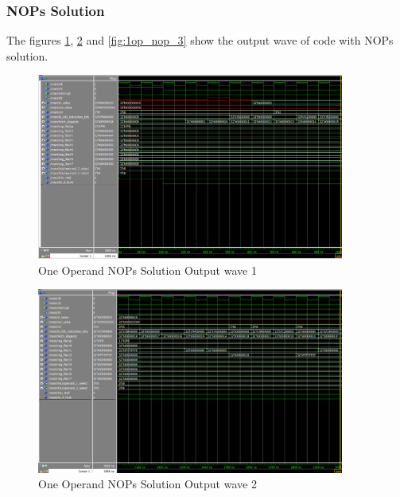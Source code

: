 \subsubsection{NOPs Solution}
The figures \ref{fig:1op_nop_1}, \ref{fig:1op_nop_2} and \ref{fig:1op_nop_3} show the output wave of code with NOPs solution.
\begin{figure}[H]
    \centering
    \includegraphics[width=0.9\textwidth]{images/test_cases/one_operand/OneOperand_NOP_1.PNG}
    \caption{One Operand NOPs Solution Output wave 1}
    \label{fig:1op_nop_1}
\end{figure}

\begin{figure}[H]
    \centering
    \includegraphics[width=0.9\textwidth]{images/test_cases/one_operand/OneOperand_NOP_2.PNG}
    \caption{One Operand NOPs Solution Output wave 2}
    \label{fig:1op_nop_2}
\end{figure}

